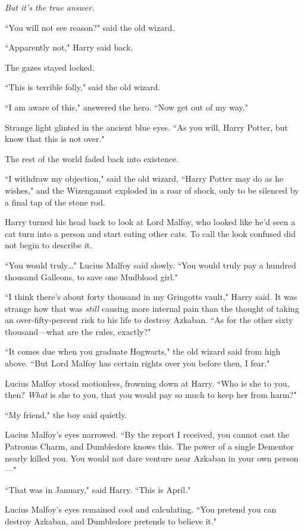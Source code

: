 \emph{But it's the true answer.}

``You will not see reason?" said the old wizard.

``Apparently not," Harry said back.

The gazes stayed locked.

``This is terrible folly," said the old wizard.

``I am aware of this," answered the hero. ``Now get out of my way."

Strange light glinted in the ancient blue eyes. ``As you will, Harry Potter, but know that this is not over."

The rest of the world faded back into existence.

``I withdraw my objection," said the old wizard, ``Harry Potter may do as he wishes," and the Wizengamot exploded in a roar of shock, only to be silenced by a final tap of the stone rod.

Harry turned his head back to look at Lord Malfoy, who looked like he'd seen a cat turn into a person and start eating other cats. To call the look confused did not begin to describe it.

``You would truly{\ldots}" Lucius Malfoy said slowly. ``You would truly pay a hundred thousand Galleons, to save one Mudblood girl."

``I think there's about forty thousand in my Gringotts vault," Harry said. It was strange how that was \emph{still} causing more internal pain than the thought of taking an over-fifty-percent risk to his life to destroy Azkaban. ``As for the other sixty thousand—what are the rules, exactly?"

``It comes due when you graduate Hogwarts," the old wizard said from high above. ``But Lord Malfoy has certain rights over you before then, I fear."

Lucius Malfoy stood motionless, frowning down at Harry. ``Who is she to you, then? \emph{What} is she to you, that you would pay so much to keep her from harm?"

``My friend," the boy said quietly.

Lucius Malfoy's eyes narrowed. ``By the report I received, you cannot cast the Patronus Charm, and Dumbledore knows this. The power of a single Dementor nearly killed you. You would not dare venture near Azkaban in your own person—"

``That was in January," said Harry. ``This is April."

Lucius Malfoy's eyes remained cool and calculating. ``You pretend you can destroy Azkaban, and Dumbledore pretends to believe it."


